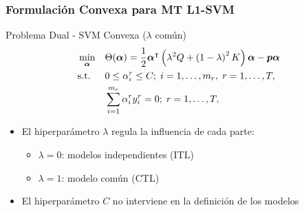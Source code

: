 \documentclass{beamer}
\newcommand{\upper}[1]{\expandafter\MakeUppercase\expandafter{#1}}
\newcommand{\mymat}[1]{\upper{#1}}
\newcommand{\myvec}[1]{\bm{#1}}
\newcommand{\fv}[1]{\myvec{#1}}
\newcommand{\fm}[1]{\mymat{#1}}
\newcommand{\ntasks}{T}
\newcommand{\npertask}{m}
\begin{document}
  \begin{frame}
      \frametitle{Formulación Convexa para MT L1-SVM}
  
      \begin{block}{Problema Dual - SVM Convexa ($\lambda$ común)}
            \begin{equation}\nonumber
                  \begin{aligned}
                  & \min_{\fv{\alpha}} && \Theta(\fv{\alpha}) = \frac{1}{2} \fv{\alpha}^\intercal \left(\lambda^2 \fm{Q} + \left( 1 - \lambda \right)^2 \fm{K}  \right) \fv{\alpha} - \fv{p} \fv{\alpha} \\
                  & \text{s.t.}
                  & & 0 \leq \alpha_i^r \leq C ; \; i=1, \ldots, \npertask_r,\; r=1, \ldots, \ntasks ,\\
                  & & & \sum_{i=1}^{m_r} \alpha_i^r y_i^r = 0;\;  r=1, \ldots, \ntasks , \\
                  \end{aligned}
              \end{equation}
      \end{block}
      \begin{itemize}
            \item El hiperparámetro $\lambda$ regula la influencia de cada parte:
            \begin{itemize}
                \item $\lambda=0$: modelos independientes (ITL)
                \item $\lambda=1$: modelo común (CTL)
            \end{itemize}
            \item El hiperparámetro $C$ no interviene en la definición de los modelos
      \end{itemize}

  \end{frame}
\end{document}
